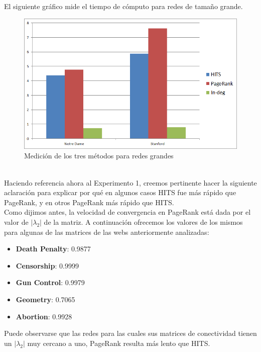 \documentclass[a4paper]{article}
\begin{document}
El siguiente gr\'afico mide el tiempo de c\'omputo para redes de tama\~no grande.\\
\begin{figure}[h!]
  \begin{center}
	\includegraphics[scale=0.50]{imagenes/expTiempo/tiemposGrandes.png}
	\caption{Medici\'on de los tres m\'etodos para redes grandes}
	\label{nombreparareferenciar}
  \end{center}
\end{figure}
\\
Haciendo referencia ahora al Experimento 1, creemos pertinente hacer la siguiente aclaración para explicar por qué en algunos casos HITS fue más rápido que PageRank, y en otros PageRank más rápido que HITS. \\
Como dijimos antes, la velocidad de convergencia en PageRank está dada por el valor de $|\lambda_2|$ de la matriz. A continuación ofrecemos los valores de los mismos para algunas de las matrices de las webs anteriormente analizadas:

\begin{itemize}
\item \textbf{Death Penalty}: 0.9877
\item \textbf{Censorship}: 0.9999
\item \textbf{Gun Control}: 0.9979
\item \textbf{Geometry}: 0.7065
\item \textbf{Abortion}: 0.9928
\end{itemize}

Puede observarse que las redes para las cuales sus matrices de conectividad tienen un $|\lambda_2|$ muy cercano a uno, PageRank resulta más lento que HITS.
\end{document}
